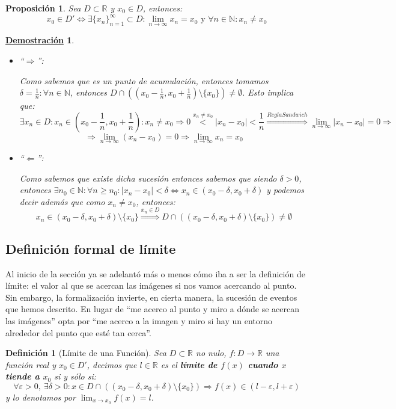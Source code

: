 \documentclass[10pt,a4paper,openright]{book}
\theoremstyle{break}
\newtheorem{defi}{Definición}[chapter]
\newtheorem{prop}{Proposición}[chapter]
\newtheorem*{demo}{\underline{Demostración}}
\begin{document}
\begin{prop}
Sea $D\subset \mathbb R$ y $x_0\in D$, entonces:
$$x_0 \in D' \Leftrightarrow \exists \{x_n\}_{n=1}^\infty \subset D: \lim_{n\rightarrow \infty} x_n=x_0\mbox{ y } \forall n \in \mathbb{N} : x_n \neq x_0$$
\end{prop}
\begin{demo}
\begin{itemize}
\item ``$\Rightarrow $'':\par
Como sabemos que es un punto de acumulación, entonces tomamos $\delta=\frac{1}{n}: \forall n\in \mathbb N$, entonces $D\cap \left((x_0-\frac{1}{n}, x_0+\frac{1}{n})\mbox{\textbackslash} \{x_0\}\right)\neq \emptyset$. Esto implica que:
$$\exists x_n\in D: x_n\in \left(x_0-\frac{1}{n}, x_0+\frac{1}{n}\right): x_n\neq x_0\Rightarrow 0\stackrel{x_n\neq x_0}{<}|x_n-x_0|<\frac{1}{n} \stackrel{ReglaSandwich}{\Rightarrow} \lim_{n\rightarrow \infty} |x_n-x_0|=0\Rightarrow$$
$$\Rightarrow \lim_{n\rightarrow \infty} (x_n-x_0)=0\Rightarrow \lim_{n\rightarrow \infty} x_n=x_0$$

\item ``$\Leftarrow$'':\par
Como sabemos que existe dicha sucesión entonces sabemos que siendo $\delta >0$, entonces $\exists n_0\in \mathbb N: \forall n\geq n_0: |x_n-x_0|<\delta\Leftrightarrow x_n\in (x_0-\delta , x_0+\delta)$ y podemos decir además que como $x_n\neq x_0$, entonces:
$$x_n\in (x_0-\delta , x_0+\delta)\mbox{\textbackslash} \{x_0\}\stackrel{x_n\in D}{\Rightarrow} D\cap\left((x_0-\delta , x_0+\delta)\mbox{\textbackslash} \{x_0\}\right) \neq \emptyset$$
\end{itemize}
\end{demo}

\subsection{Definición formal de límite}
Al inicio de la sección ya se adelantó más o menos cómo iba a ser la definición de límite: el valor al que se acercan las imágenes si nos vamos acercando al punto. Sin embargo, la formalización invierte, en cierta manera, la sucesión de eventos que hemos descrito. En lugar de ``me acerco al punto y miro a dónde se acercan las imágenes'' opta por ``me acerco a la imagen y miro si hay un entorno alrededor del punto que esté tan cerca''.

\begin{defi}[Límite de una Función]
Sea $D\subset \mathbb R$ no nulo, $f:D\longrightarrow \mathbb R$ una función real y $x_0\in D'$, decimos que $l\in \mathbb R$ es el \textbf{límite de $f(x)$ cuando $x$ tiende a $x_0$} si y sólo si:
\[
\forall \varepsilon>0, \ \exists \delta>0 : x\in D\cap \left((x_0-\delta, x_0+\delta)\mbox{\textbackslash} \{x_0\}\right)\Rightarrow f(x)\in (l-\varepsilon, l+\varepsilon)
\]
y lo denotamos por $\lim_{x\rightarrow x_0} f(x) = l$.
\end{defi}
\end{document}
